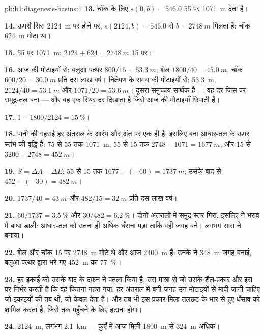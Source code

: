 \begin{solution}{pb:b1:diagenesis-basins:1}
\textbf{13.} चॉक के लिए $s(0, b) = 546.0$ \qty{55}{\Ma} पर \qty{1071}{m} देता है।

\textbf{14.} ऊपरी सिरा \qty{2124}{m} पर होने पर, $s(2124, b) = 546.0$ से $b =
\qty{2748}{m}$ मिलता है: चॉक \qty{624}{m} मोटा था।

\textbf{15.} \qty{55}{\Ma} पर \qty{1071}{m}; $2124 + 624 = \qty{2748}{m}$ \qty{15}{\Ma} पर।

\textbf{16.} आज की मोटाइयों से: बलुआ पत्थर $800/15 = \qty{53.3}{m}$, शेल
$1800/40 = \qty{45.0}{m}$, चॉक $600/20 = \qty{30.0}{m}$ प्रति दस लाख वर्ष। निक्षेपण
के समय की मोटाइयों से: \qty{53.3}{m}, $2124/40 =
\qty{53.1}{m}$ और $1071/20 = \qty{53.6}{m}$। दूसरा समुच्चय सार्थक है --- वह दर जिस पर
समुद्र-तल बना --- और वह एक स्थिर दर दिखाता है जिसे आज की मोटाइयाँ छिपाती हैं।

\textbf{17.} $1 - 1800/2124 = \qty{15}{\%}$।

\textbf{18.} पानी की गहराई हर अंतराल के आरंभ और अंत पर एक ही है, इसलिए बना
 आधार-तल के ऊपर स्तंभ की वृद्धि है: \qty{75}{\Ma} से \qty{55}{\Ma} तक
\qty{1071}{m}, \qty{55}{\Ma} से \qty{15}{\Ma} तक $2748 - 1071 = \qty{1677}{m}$, और
\qty{15}{\Ma} से $3200 - 2748 = \qty{452}{m}$।

\textbf{19.} $S = \Delta A - \Delta E$: \qty{55}{\Ma} से \qty{15}{\Ma} तक
$1677 - (-60) = \qty{1737}{m}$; उसके बाद से $452 - (-30) = \qty{482}{m}$।

\textbf{20.} $1737/40 = \qty{43}{m}$ और $482/15 = \qty{32}{m}$ प्रति दस लाख वर्ष।

\textbf{21.} $60/1737 = \qty{3.5}{\%}$ और $30/482 = \qty{6.2}{\%}$। दोनों अंतरालों में
समुद्र-स्तर गिरा, इसलिए  ने भराव में बाधा डाली: आधार-तल को उतना ही अधिक
धँसना पड़ा ताकि वही जगह बने। लगभग सारा   ने बनाया।

\textbf{22.} शेल और चॉक \qty{15}{\Ma} पर \qty{2748}{m} मोटे थे और आज \qty{2400}{m} हैं:
उनके  ने \qty{348}{m} जगह बनाई, बलुआ पत्थर द्वारा भरे गए \qty{452}{m} का
\qty{77}{\%}।

\textbf{23.} हर इकाई को उसके बाद के दफ़न ने पतला किया है, उस मात्रा से जो उसके
शैल-प्रकार और इस पर निर्भर करती है कि वह कितना गहरा गया; हर अंतराल में बनी जगह
उन मोटाइयों से मापी जानी चाहिए जो इकाइयों की तब थीं, जो केवल  देता
है। और तब भी इस प्रकार मिला  तलछट के भार से हुए धँसाव को शामिल करता है,
जिसे  तक पहुँचने के लिए हटाना होगा।

\textbf{24.} \qty{2124}{m}, लगभग \qty{2.1}{km} --- कुएँ में आज मिली \qty{1800}{m} से
\qty{324}{m} अधिक।
\end{solution}
